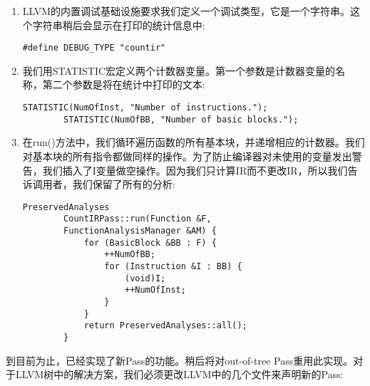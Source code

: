 \begin{enumerate}
	\item LLVM的内置调试基础设施要求我们定义一个调试类型，它是一个字符串。这个字符串稍后会显示在打印的统计信息中:
	\begin{lstlisting}[caption={}]
		#define DEBUG_TYPE "countir"
	\end{lstlisting}
	
	\item 我们用STATISTIC宏定义两个计数器变量。第一个参数是计数器变量的名称，第二个参数是将在统计中打印的文本:
	\begin{lstlisting}[caption={}]
		STATISTIC(NumOfInst, "Number of instructions.");
		STATISTIC(NumOfBB, "Number of basic blocks.");
	\end{lstlisting}
	
	\item 在run()方法中，我们循环遍历函数的所有基本块，并递增相应的计数器。我们对基本块的所有指令都做同样的操作。为了防止编译器对未使用的变量发出警告，我们插入了I变量做空操作。因为我们只计算IR而不更改IR，所以我们告诉调用者，我们保留了所有的分析:
	\begin{lstlisting}[caption={}]
		PreservedAnalyses
		CountIRPass::run(Function &F,
		FunctionAnalysisManager &AM) {
			for (BasicBlock &BB : F) {
				++NumOfBB;
				for (Instruction &I : BB) {
					(void)I;
					++NumOfInst;
				}
			}
			return PreservedAnalyses::all();
		}
	\end{lstlisting}
	
\end{enumerate}

到目前为止，已经实现了新Pass的功能。稍后将对out-of-tree Pass重用此实现。对于LLVM树中的解决方案，我们必须更改LLVM中的几个文件来声明新的Pass:\par

